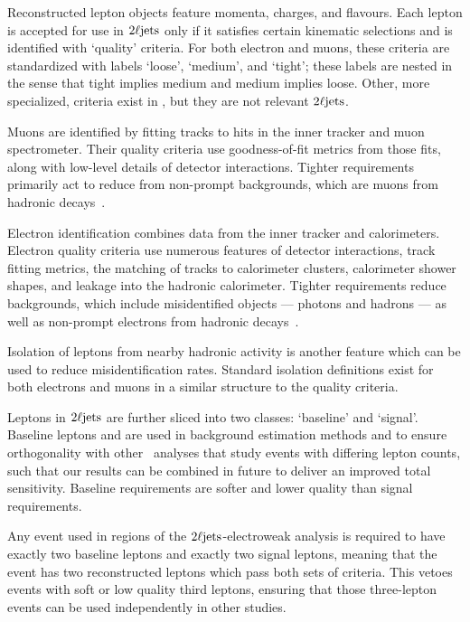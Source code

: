 Reconstructed lepton objects feature momenta, charges, and flavours.
Each lepton is accepted for use in $2\ell\mathrm{jets}$ only if it satisfies certain
kinematic selections and is identified with `quality' criteria.
For both electron and muons, these criteria are standardized with labels
`loose', `medium', and `tight';
these labels are nested in the sense that tight implies medium
and medium implies loose.
Other, more specialized, criteria exist in \atlas, but they are not relevant
$2\ell\mathrm{jets}$.

Muons are identified by fitting tracks to hits in the inner tracker and muon
spectrometer.
Their quality criteria use goodness-of-fit metrics from those fits, along with
low-level details of detector interactions.
Tighter requirements primarily act to reduce from non-prompt backgrounds,
which are muons from hadronic decays~\cite{atlas_muon_quality_MUON_2018_03}.

Electron identification combines data from the inner tracker and
calorimeters.
Electron quality criteria use numerous features of detector
interactions, track fitting metrics, the matching of tracks to calorimeter
clusters, calorimeter shower shapes, and leakage into the hadronic calorimeter.
Tighter requirements reduce backgrounds, which include misidentified objects
--- photons and hadrons --- as well as non-prompt electrons from hadronic
decays~\cite{atlas_egamma_quality_EGAM_2018_01}.

Isolation of leptons from nearby hadronic activity is another feature which
can be used to reduce misidentification rates.
Standard isolation definitions exist for both electrons and muons in a similar
structure to the quality criteria.

Leptons in $2\ell\mathrm{jets}$ are further sliced into two classes:
`baseline' and `signal'.
Baseline leptons and are used in background estimation methods and to ensure
orthogonality with other \atlas\ analyses that study events with differing
lepton counts, such that our results can be combined in future to deliver an
improved total sensitivity.
Baseline requirements are softer and lower quality than signal requirements.

Any event used in regions of the $2\ell\mathrm{jets}$-electroweak analysis is required
to have exactly two baseline leptons and exactly two signal leptons, meaning
that the event has two reconstructed leptons which pass both sets of criteria.
This vetoes events with soft or low quality third leptons, ensuring that those
three-lepton events can be used independently in other studies.

